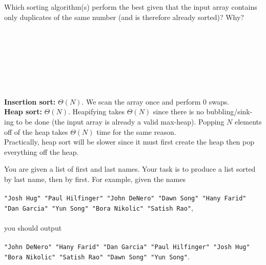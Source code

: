 \question Which sorting algorithm(s) perform the best given that the input array
contains only duplicates of the same number (and is therefore already sorted)? Why?

\ifprintanswers\else
\hspace \\ \\ \\ \\ \\ \\
\fi 

\begin{solution}
\textbf{Insertion sort:} $\Theta(N)$. We scan the array once and perform 0 swaps.
\\
\textbf{Heap sort:} $\Theta(N)$. Heapifying takes $\Theta(N)$ since there is no bubbling/sink-
ing to be done (the input array is already a valid max-heap). Popping $N$ elements off of the heap takes $\Theta(N)$ time for the same reason. \\
Practically, heap sort will be slower since it must first create the heap then
pop everything off the heap.
\end{solution}

\question You are given a list of first and last names. Your task is to produce a list
sorted by last name, then by first. For example, given the names 
\\ \\ 
\lstinline{"Josh Hug" "Paul Hilfinger" "John DeNero" "Dawn Song" "Hany Farid" "Dan Garcia" "Yun Song" "Bora Nikolic" "Satish Rao"}, 
\\ \\ 
you should output 
\\ \\
\lstinline{"John DeNero" "Hany Farid" "Dan Garcia" "Paul Hilfinger" "Josh Hug" "Bora Nikolic" "Satish Rao" "Dawn Song" "Yun Song"}.

